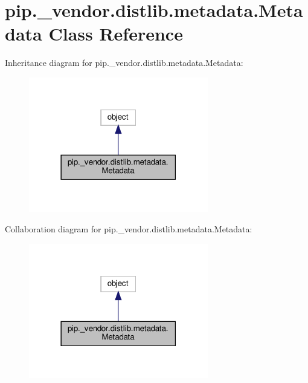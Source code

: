 \hypertarget{classpip_1_1__vendor_1_1distlib_1_1metadata_1_1Metadata}{}\section{pip.\+\_\+vendor.\+distlib.\+metadata.\+Metadata Class Reference}
\label{classpip_1_1__vendor_1_1distlib_1_1metadata_1_1Metadata}


Inheritance diagram for pip.\+\_\+vendor.\+distlib.\+metadata.\+Metadata\+:
\nopagebreak
\begin{figure}[H]
\begin{center}
\leavevmode
\includegraphics[width=222pt]{classpip_1_1__vendor_1_1distlib_1_1metadata_1_1Metadata__inherit__graph}
\end{center}
\end{figure}


Collaboration diagram for pip.\+\_\+vendor.\+distlib.\+metadata.\+Metadata\+:
\nopagebreak
\begin{figure}[H]
\begin{center}
\leavevmode
\includegraphics[width=222pt]{classpip_1_1__vendor_1_1distlib_1_1metadata_1_1Metadata__coll__graph}
\end{center}
\end{figure}
